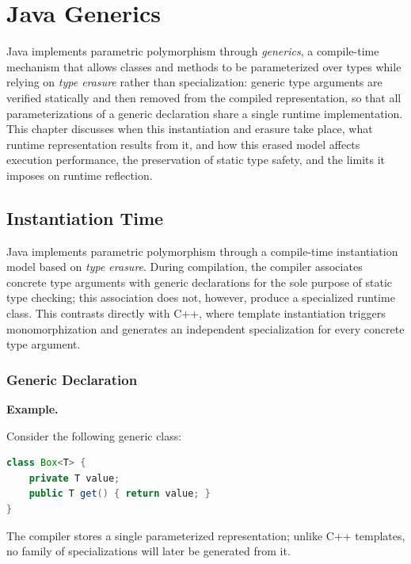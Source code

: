 \documentclass[11pt]{report}
\begin{document}
\chapter{Java Generics}
\label{JavaGenerics}
Java implements parametric polymorphism through \emph{generics}, a
compile-time mechanism that allows classes and methods to be parameterized
over types while relying on \emph{type erasure} rather than
specialization: generic type arguments are verified statically and then
removed from the compiled representation, so that all parameterizations of
a generic declaration share a single runtime implementation. This chapter
discusses when this instantiation and erasure take place, what runtime
representation results from it, and how this erased model affects
execution performance, the preservation of static type safety, and the
limits it imposes on runtime reflection.
\section{Instantiation Time}

Java implements parametric polymorphism through a compile-time instantiation
model based on \emph{type erasure}. During compilation, the compiler
associates concrete type arguments with generic declarations for the sole
purpose of static type checking; this association does not, however, produce
a specialized runtime class. This contrasts directly with C++, where
template instantiation triggers monomorphization and generates an
independent specialization for every concrete type argument.

\subsection{Generic Declaration}

\begin{examplebox}
\textbf{Example.}

Consider the following generic class:

\begin{lstlisting}[language=Java]
class Box<T> {
    private T value;
    public T get() { return value; }
}
\end{lstlisting}
\end{examplebox}

The compiler stores a single parameterized representation; unlike C++
templates, no family of specializations will later be generated from it.
\end{document}
